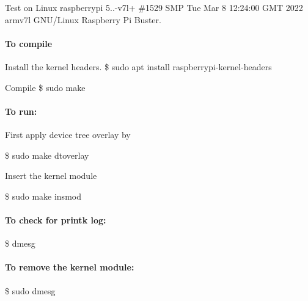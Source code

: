 Test on Linux raspberrypi 5..-\/v7l+ \#1529 S\+MP Tue Mar 8 12\+:24\+:00 G\+MT 2022 armv7l G\+N\+U/\+Linux Raspberry Pi Buster.

\paragraph*{To compile}

Install the kernel headers. \$ sudo apt install raspberrypi-\/kernel-\/headers

Compile \$ sudo make

\paragraph*{To run\+:}


\begin{DoxyEnumerate}
\item First apply device tree overlay by

\$ sudo make dtoverlay
\item Insert the kernel module

\$ sudo make insmod
\end{DoxyEnumerate}

\paragraph*{To check for printk log\+:}

\$ dmesg

\paragraph*{To remove the kernel module\+:}

\$ sudo dmesg 